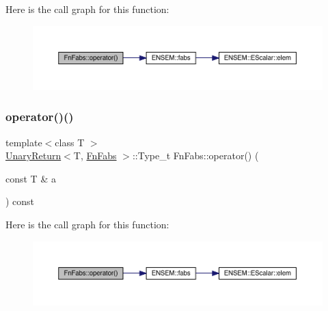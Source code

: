 Here is the call graph for this function\+:
\nopagebreak
\begin{figure}[H]
\begin{center}
\leavevmode
\includegraphics[width=350pt]{dd/d25/structFnFabs_a0813fbaa7b8028c3880585e4095fd2ca_cgraph}
\end{center}
\end{figure}
\mbox{\label{structFnFabs_a0813fbaa7b8028c3880585e4095fd2ca}} 
\subsubsection{\texorpdfstring{operator()()}{operator()()}\hspace{0.1cm}{\footnotesize\ttfamily [2/3]}}
{\footnotesize\ttfamily template$<$class T $>$ \\
\mbox{\hyperlink{structUnaryReturn}{Unary\+Return}}$<$T, \mbox{\hyperlink{structFnFabs}{Fn\+Fabs}} $>$\+::Type\+\_\+t Fn\+Fabs\+::operator() (\begin{DoxyParamCaption}\item[{const T \&}]{a }\end{DoxyParamCaption}) const\hspace{0.3cm}{\ttfamily [inline]}}

Here is the call graph for this function\+:
\nopagebreak
\begin{figure}[H]
\begin{center}
\leavevmode
\includegraphics[width=350pt]{dd/d25/structFnFabs_a0813fbaa7b8028c3880585e4095fd2ca_cgraph}
\end{center}
\end{figure}
\mbox{\label{structFnFabs_a0813fbaa7b8028c3880585e4095fd2ca}} 
